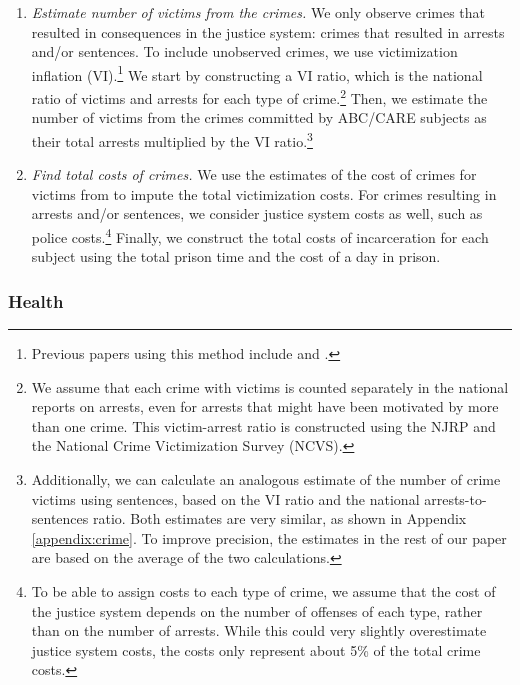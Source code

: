 \begin{enumerate}
\item \textit{Estimate number of victims from the crimes.} We only observe crimes that resulted in consequences in the justice system: crimes that resulted in arrests and/or sentences. To include unobserved crimes, we use victimization inflation (VI).\footnote{Previous papers using this method include \citet{Belfield_Nores_etal_2006_JHR} and \cite{Heckman_Moon_etal_2010_RateofReturn}.} We start by constructing a VI ratio, which is the national ratio of victims and arrests for each type of crime.\footnote{We assume that each crime with victims is counted separately in the national reports on arrests, even for arrests that might have been motivated by more than one crime. This victim-arrest ratio is constructed using the NJRP and the National Crime Victimization Survey (NCVS).} Then, we estimate the number of victims from the crimes committed by ABC/CARE subjects as their total arrests multiplied by the VI ratio.\footnote{Additionally, we can calculate an analogous estimate of the number of crime victims using sentences, based on the VI ratio and the national arrests-to-sentences ratio. Both estimates are very similar, as shown in Appendix \ref{appendix:crime}. To improve precision, the estimates in the rest of our paper are based on the average of the two calculations.}

\item \textit{Find total costs of crimes.} We use the estimates of the cost of crimes for victims from \cite{McCollister_etal_2010_DAD} to impute the total victimization costs. For crimes resulting in arrests and/or sentences, we consider justice system costs as well, such as police costs.\footnote{To be able to assign costs to each type of crime, we assume that the cost of the justice system depends on the number of offenses of each type, rather than on the number of arrests. While this could very slightly overestimate justice system costs, the costs only represent about 5\% of the total crime costs.} Finally, we construct the total costs of incarceration for each subject using the total prison time and the cost of a day in prison.
\end{enumerate}

\subsubsection{Health} \label{section:health}

